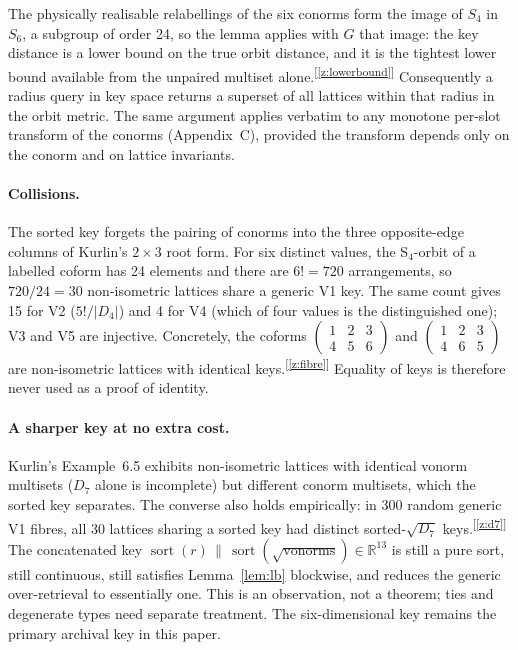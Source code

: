 \documentclass[11pt]{article}
\newcommand{\chk}[1]{\textsuperscript{[\ref{#1}]}}
\begin{document}
The physically realisable relabellings of the six conorms form the image of $S_4$ in $S_6$, a subgroup of order 24, so the lemma applies with $G$ that image: the key distance is a lower bound on the true orbit distance, and it is the tightest lower bound available from the unpaired multiset alone.\chk{z:lowerbound} Consequently a radius query in key space returns a superset of all lattices within that radius in the orbit metric. The same argument applies verbatim to any monotone per-slot transform of the conorms (Appendix~C), provided the transform depends only on the conorm and on lattice invariants.

\paragraph{Collisions.}
The sorted key forgets the pairing of conorms into the three opposite-edge columns of Kurlin's $2\times3$ root form. For six distinct values, the S$_4$-orbit of a labelled coform has 24 elements and there are $6!=720$ arrangements, so $720/24=30$ non-isometric lattices share a generic V1 key. The same count gives 15 for V2 ($5!/|D_4|$) and 4 for V4 (which of four values is the distinguished one); V3 and V5 are injective. Concretely, the coforms $\begin{pmatrix}1&2&3\\4&5&6\end{pmatrix}$ and $\begin{pmatrix}1&2&3\\4&6&5\end{pmatrix}$ are non-isometric lattices with identical keys.\chk{z:fibre} Equality of keys is therefore never used as a proof of identity.

\paragraph{A sharper key at no extra cost.}
Kurlin's Example~6.5 exhibits non-isometric lattices with identical vonorm multisets ($D_7$ alone is incomplete) but different conorm multisets, which the sorted key separates. The converse also holds empirically: in 300 random generic V1 fibres, all 30 lattices sharing a sorted key had distinct sorted-$\sqrt{D_7}$ keys.\chk{z:d7} The concatenated key $\operatorname{sort}(r)\,\|\,\operatorname{sort}(\sqrt{\text{vonorms}})\in\mathbb R^{13}$ is still a pure sort, still continuous, still satisfies Lemma~\ref{lem:lb} blockwise, and reduces the generic over-retrieval to essentially one. This is an observation, not a theorem; ties and degenerate types need separate treatment. The six-dimensional key remains the primary archival key in this paper.
\end{document}
